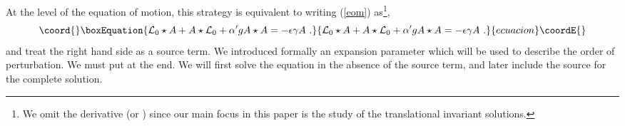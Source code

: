 \documentclass[a4paper,aps,preprint,nofootinbib,eqsecnum]{revtex4}
\begin{document}
At the level of the equation of motion, this strategy is equivalent to
writing (\ref{eom}) as\footnote{%
We omit the \coordHE{} derivative (or \coordHE{}) since our main focus in
this paper is the study of the translational invariant solutions.},
\begin{equation}\coord{}\boxEquation{
{\mathcal{L}_{0}}\star A+A\star {\mathcal{L}_{0}}+{\alpha ^{\prime }}gA\star
A=-\epsilon \gamma A\,\,.  \label{eom2}
}{
{\mathcal{L}_{0}}\star A+A\star {\mathcal{L}_{0}}+{\alpha ^{\prime }}gA\star
A=-\epsilon \gamma A\,\,.  }{ecuacion}\coordE{}\end{equation}%
and treat the right hand side as a source term. We introduced formally an
expansion parameter \myHighlight{$\epsilon $}\coordHE{} which will be used to describe the order of
perturbation. We must put \coordHE{} at the end. We will first solve the
equation in the absence of the source term, and later include the source for
the complete solution.
\end{document}
